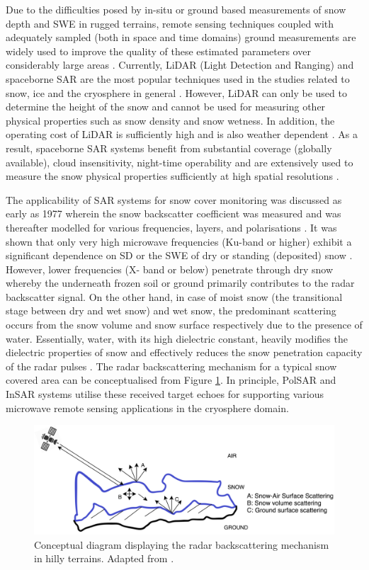 \documentclass[review]{elsarticle}
\begin{document}
Due to the difficulties posed by in-situ or ground based measurements of snow depth and SWE in rugged terrains, remote sensing techniques coupled with adequately sampled (both in space and time domains) ground measurements are widely used to improve the quality of these estimated parameters over considerably large areas \citep{Takala2011}. Currently, LiDAR (Light Detection and Ranging) and spaceborne SAR are the most popular techniques used in the studies related to snow, ice and the cryosphere in general \citep{Deems2013, Leinss2014, Tedesco2015}. However, LiDAR can only be used to determine the height of the snow and cannot be used for measuring other physical properties such as snow density and snow wetness. In addition, the operating cost of LiDAR is sufficiently high and is also weather dependent \citep{Deems2013}. As a result, spaceborne SAR systems benefit from substantial coverage (globally available), cloud insensitivity, night-time operability and are extensively used to measure the snow physical properties sufficiently at high spatial resolutions \citep{Moreira2013, Thakur2012}.

The applicability of SAR systems for snow cover monitoring was discussed as early as 1977 \citep{Ulaby1977} wherein the snow backscatter coefficient was measured and was thereafter modelled for various frequencies, layers, and polarisations \citep{Zuniga1979}. It was shown that only very high microwave frequencies (Ku-band or higher) exhibit a significant dependence on SD or the SWE of dry or standing (deposited) snow \citep{Yueh2009}. However, lower frequencies (X-
band or below) penetrate through dry snow whereby the underneath frozen soil or ground primarily contributes to the radar backscatter signal. On the other hand, in case of moist snow (the transitional stage between dry and wet snow) and wet snow, the predominant scattering occurs from the snow volume and snow surface respectively due to the presence of water. Essentially, water, with its high dielectric constant, heavily modifies the dielectric properties of snow and effectively reduces the snow penetration capacity of the radar pulses \citep{Abe1990}. The radar backscattering mechanism for a typical snow covered area can be conceptualised from Figure \ref{fig:concept}. In principle, PolSAR and InSAR systems utilise these received target echoes for supporting various microwave remote sensing applications in the cryosphere domain.

\begin{figure}[htb]
    \centering
    \includegraphics[width=\textwidth]{Figures/Conceptual.png}
    \caption{Conceptual diagram displaying the radar backscattering mechanism in hilly terrains. Adapted from \cite{Thakur2012}.}
    \label{fig:concept}
\end{figure}
\end{document}
